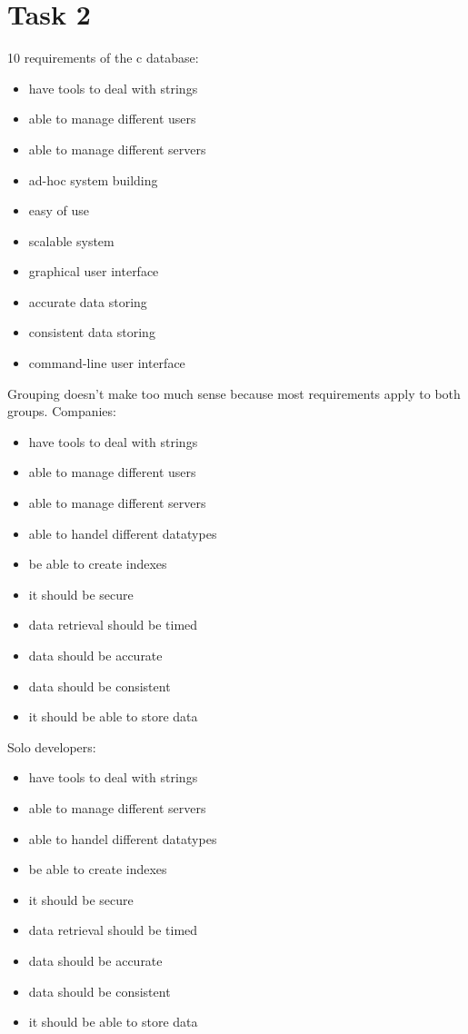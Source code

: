 \chapter{Task 2}
\begin{elenco}
\item 10 requirements of the c database:
\begin{itemize}
	\item have tools to deal with strings
	\item able to manage different users
    \item able to manage different servers
    \item ad-hoc system building 
    \item easy of use
    \item scalable system
    \item graphical user interface
    \item accurate data storing
    \item consistent data storing
    \item command-line user interface
\end{itemize} 

\item Grouping doesn't make too much sense because most requirements apply to both groups.
Companies:
\begin{itemize}
    \item have tools to deal with strings
    \item able to manage different users
    \item able to manage different servers
    \item able to handel different datatypes
    \item be able to create indexes
    \item it should be secure
    \item data retrieval should be timed
    \item data should be accurate
    \item data should be consistent
    \item it should be able to store data
\end{itemize}
Solo developers:
\begin{itemize}
    \item have tools to deal with strings
    \item able to manage different servers
    \item able to handel different datatypes
    \item be able to create indexes
    \item it should be secure
    \item data retrieval should be timed
    \item data should be accurate
    \item data should be consistent
    \item it should be able to store data
\end{itemize}


\end{elenco}

